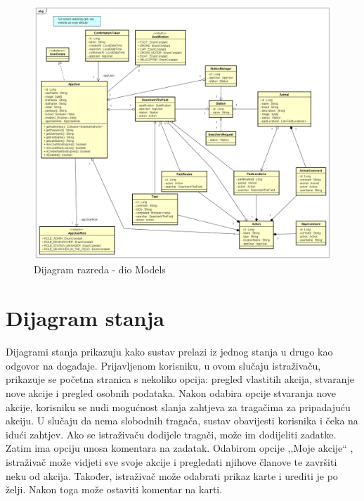 			\begin{figure}[H]
				\includegraphics[scale=0.4]{dijagrami/Model.png} 
				\centering
				\caption{Dijagram razreda - dio Models}
				\label{fig:promjene}
			\end{figure}
			
			
			\eject
		
		\section{Dijagram stanja}
			
			
			Dijagrami stanja prikazuju kako sustav prelazi iz jednog stanja u drugo kao odgovor na događaje. Prijavljenom korisniku, u ovom slučaju istraživaču, prikazuje se početna stranica s nekoliko opcija: pregled vlastitih akcija, stvaranje nove akcije i pregled osobnih podataka. Nakon odabira opcije stvaranja nove akcije, korisniku se nudi mogućnost slanja zahtjeva za tragačima za pripadajuću akciju. U slučaju da nema slobodnih tragača, sustav obavijesti korisnika i čeka na idući zahtjev. Ako se istraživaču dodijele tragači, može im dodijeliti zadatke. Zatim ima opciju unosa komentara na zadatak. Odabirom opcije ,,Moje akcije“ , istraživač može vidjeti sve svoje akcije i pregledati njihove članove te završiti neku od akcija.  Također, istraživač može odabrati prikaz karte i urediti je po želji. Nakon toga može ostaviti komentar na karti.
			
